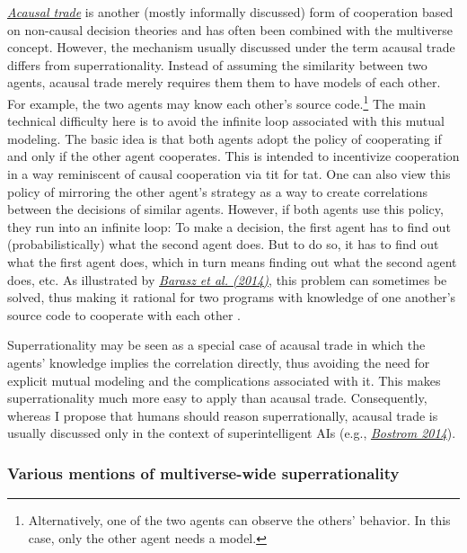 \href{https://wiki.lesswrong.com/wiki/Acausal_trade}{\emph{Acausal
trade}} is another (mostly informally discussed) form of cooperation
based on non-causal decision theories and has often been combined with
the multiverse concept. However, the mechanism usually discussed under
the term acausal trade differs from superrationality. Instead of
assuming the similarity between two agents, acausal trade merely
requires them them to have models of each other. For example, the two
agents may know each other's source code.\footnote{Alternatively, one of
  the two agents can observe the others' behavior. In this case, only
  the other agent needs a model.} The main technical difficulty here is
to avoid the infinite loop associated with this mutual modeling. The
basic idea is that both agents adopt the policy of cooperating if and
only if the other agent cooperates. This is intended to incentivize
cooperation in a way reminiscent of causal cooperation via tit for tat.
One can also view this policy of mirroring the other agent's strategy as
a way to create correlations between the decisions of similar agents.
However, if both agents use this policy, they run into an infinite loop:
To make a decision, the first agent has to find out (probabilistically)
what the second agent does. But to do so, it has to find out what the
first agent does, which in turn means finding out what the second agent
does, etc. As illustrated by
\href{https://arxiv.org/abs/1401.5577}{\emph{Barasz et al. (2014)}},
this problem can sometimes be solved, thus making it rational for two
programs with knowledge of one another's source code to cooperate with
each other \parencite{LaVictoire2014-sv,Critch2016-cx}.

Superrationality may be seen as a special case of acausal trade in which
the agents' knowledge implies the correlation directly, thus avoiding
the need for explicit mutual modeling and the complications associated
with it. This makes superrationality much more easy to apply than
acausal trade. Consequently, whereas I propose that humans should reason
superrationally, acausal trade is usually discussed only in the context
of superintelligent AIs (e.g.,
\href{http://www.nickbostrom.com/papers/porosity.pdf}{\emph{Bostrom
2014}}).

\subsubsection{Various mentions of multiverse-wide
superrationality}\label{various-mentions-of-multiverse-wide-superrationality}

